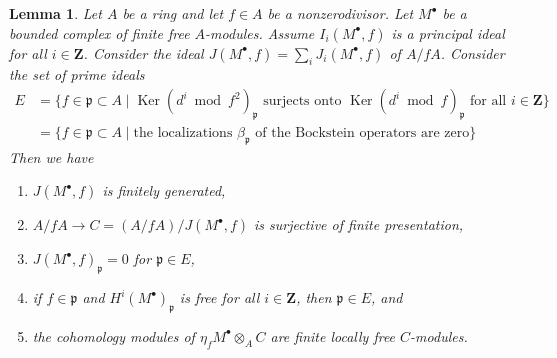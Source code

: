 \documentclass[10pt,a4paper]{amsart}
\theoremstyle{plain}
\newtheorem{lemma}[subsection]{Lemma}
\theoremstyle{definition}
\theoremstyle{remark}
\numberwithin{equation}{subsection}
\def\Ker{\mathop{\mathrm{Ker}}}
\begin{document}
\begin{lemma}
\label{lemma-eta-vanishing-beta-plus}
Let $A$ be a ring and let $f \in A$ be a nonzerodivisor. Let
$M^\bullet$ be a bounded complex of finite free $A$-modules.
Assume $I_i(M^\bullet, f)$ is a principal ideal
for all $i \in \mathbf{Z}$. Consider the ideal
$J(M^\bullet, f) = \sum_i J_i(M^\bullet, f)$ of $A/fA$.
Consider the set of prime ideals
\begin{align*}
E
& =
\{f \in \mathfrak p \subset A \mid
\Ker(d^i \bmod f^2)_\mathfrak p \text{ surjects onto }
\Ker(d^i \bmod f)_\mathfrak p \text{ for all }i \in \mathbf{Z}\} \\
& =
\{f \in \mathfrak p \subset A \mid
\text{the localizations }\beta_\mathfrak p
\text{ of the Bockstein operators are zero}\}
\end{align*}
Then we have
\begin{enumerate}
\item $J(M^\bullet, f)$ is finitely generated,
\item $A/fA \to C = (A/fA)/J(M^\bullet, f)$
is surjective of finite presentation,
\item $J(M^\bullet, f)_\mathfrak p = 0$ for $\mathfrak p \in E$,
\item if $f \in \mathfrak p$ and
$H^i(M^\bullet)_\mathfrak p$ is free for all $i \in \mathbf{Z}$,
then $\mathfrak p \in E$, and
\item the cohomology modules of
$\eta_f M^\bullet \otimes_A C$ are finite locally free $C$-modules.
\end{enumerate}
\end{lemma}
\end{document}
